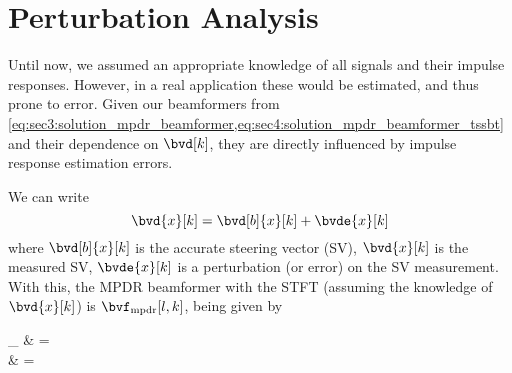 \section{Perturbation Analysis}

Until now, we assumed an appropriate knowledge of all signals and their impulse responses. However, in a real application these would be estimated, and thus prone to error. Given our beamformers from \cref{eq:sec3:solution_mpdr_beamformer,eq:sec4:solution_mpdr_beamformer_tssbt} and their dependence on $\bvd[k]$, they are directly influenced by impulse response estimation errors.

We can write
\begin{equation}
	\bvd{x}[k] = \bvd[b]{x}[k] + \bvde{x}[k]
\end{equation}
where $\bvd[b]{x}[k]$ is the accurate steering vector (SV), $\bvd{x}[k]$ is the measured SV, $\bvde{x}[k]$ is a perturbation (or error) on the SV measurement. With this, the MPDR beamformer with the STFT (assuming the knowledge of $\bvd{x}[k]$) is $\bvf_{\mpdr}[l,k]$, being given by
\begin{equations}
	\bvft_{\mpdr}
	& =  \\
	& =  \\
\end{equations}